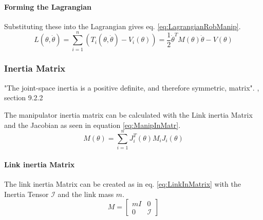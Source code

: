 \paragraph{Forming the Lagrangian}
Substituting these into the Lagrangian gives eq. \ref{eq:LagrangianRobManip}.
\begin{equation}\label{eq:LagrangianRobManip}
	L(\theta, \dot{\theta})= \sum_{i=1}^{n} (T_i(\theta,\dot{\theta})- V_i(\theta)) = \frac{1}{2} \dot{\theta}^T M(\theta)\dot{\theta}-V(\theta)
\end{equation}



%

%
%



\subsubsection{Inertia Matrix }

"The joint-space inertia is a positive definite, and therefore symmetric, matrix". \cite{CorkeRoboticVisionControl}, section 9.2.2

The manipulator inertia matrix can be calculated with the Link inertia Matrix and the Jacobian as seen in equation \ref{eq:ManipInMatr}.
\begin{equation}\label{eq:ManipInMatr}
	M(\theta) = \sum_{i=1}^{n} J_i^T(\theta) M_i J_i(\theta)
\end{equation}

\paragraph{Link inertia Matrix}
The link inertia Matrix can be created as in eq. \ref{eq:LinkInMatrix} with the Inertia Tensor $\mathcal{I}$ and the link mass $m$.
\begin{equation}\label{eq:LinkInMatrix}
	M= 
	\begin{bmatrix}
	mI & 0\\
	0  & \mathcal{I}
	\end{bmatrix}
\end{equation}

